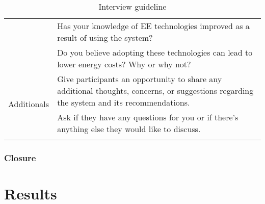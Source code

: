 \begin{center}
\begin{longtable}{ | p{} | p{} | }
    & Has your knowledge of EE technologies improved as a result of using the system? \\
    & Do you believe adopting these technologies can lead to lower energy costs? Why or why not? \\
    \hline
    \multirow{2}{4em}{Additionals} & Give participants an opportunity to share any additional thoughts, concerns, or suggestions regarding the system and its recommendations. \\
    & Ask if they have any questions for you or if there's anything else they would like to discuss. \\
    \hline
  \caption{Interview guideline}
  \label{tab:interview}
  \end{longtable}
\end{center}


\subsubsection{Closure}



\section{Results}
